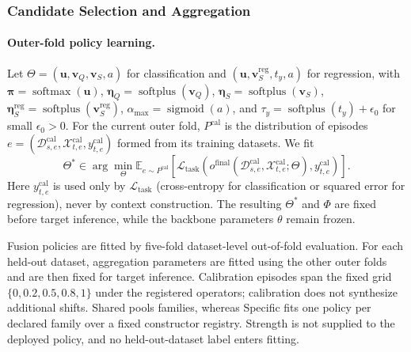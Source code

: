 \fi
\subsubsection{Candidate Selection and Aggregation}
\label{app:regression_evidence}

\paragraph{Outer-fold policy learning.}
\label{app:policy_learning}
Let $\Theta=(\mathbf u,\mathbf v_Q,\mathbf v_S,a)$ for classification and
$(\mathbf u,\mathbf v_S^{\mathrm{reg}},t_y,a)$ for regression, with
$\boldsymbol\pi=\operatorname{softmax}(\mathbf u)$,
$\boldsymbol\eta_Q=\operatorname{softplus}(\mathbf v_Q)$,
$\boldsymbol\eta_S=\operatorname{softplus}(\mathbf v_S)$,
$\boldsymbol\eta_S^{\mathrm{reg}}=
\operatorname{softplus}(\mathbf v_S^{\mathrm{reg}})$,
$\alpha_{\max}=\operatorname{sigmoid}(a)$, and
$\tau_y=\operatorname{softplus}(t_y)+\epsilon_0$ for small $\epsilon_0>0$.
For the current outer fold, $P^{\mathrm{cal}}$ is the distribution of episodes
$e=(\mathcal D_{s,e}^{\mathrm{cal}},\mathcal X_{t,e}^{\mathrm{cal}},
y_{t,e}^{\mathrm{cal}})$ formed from its training datasets. We fit
\begin{equation}
  \Theta^*\in\arg\min_{\Theta}
  \mathbb E_{e\sim P^{\mathrm{cal}}}
  \!\left[\mathcal L_{\mathrm{task}}
  \!\left(o^{\mathrm{final}}(\mathcal D_{s,e}^{\mathrm{cal}},
  \mathcal X_{t,e}^{\mathrm{cal}};\Theta),y_{t,e}^{\mathrm{cal}}\right)\right].
  \label{eq:joint_calibration}
\end{equation}
Here $y_{t,e}^{\mathrm{cal}}$ is used only by $\mathcal L_{\mathrm{task}}$
(cross-entropy for classification or squared error for regression), never by
context construction. The resulting $\Theta^*$ and $\Phi$ are fixed before
target inference, while the backbone parameters $\theta$ remain frozen.

Fusion policies are fitted by five-fold dataset-level out-of-fold evaluation.
For each held-out dataset, aggregation parameters are fitted using the other
outer folds and are then fixed for target inference. Calibration episodes span
the fixed grid $\{0,0.2,0.5,0.8,1\}$ under the registered operators;
calibration does not synthesize additional shifts. Shared pools families,
whereas Specific fits one policy per declared family over a fixed constructor
registry. Strength is not supplied to the deployed policy, and no
held-out-dataset label enters fitting.

